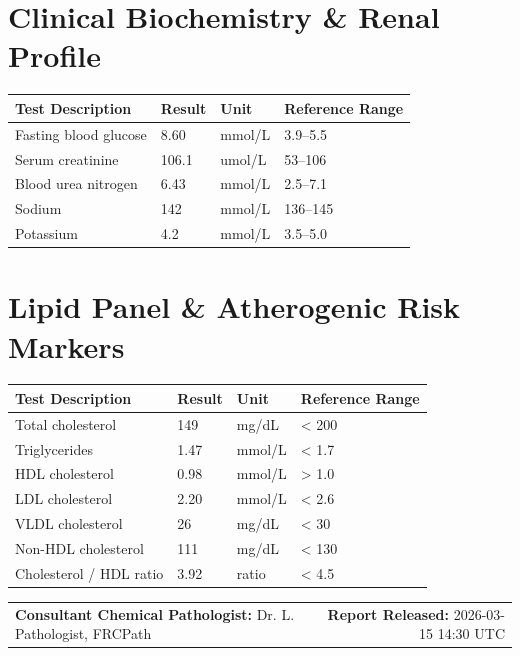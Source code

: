 \documentclass[10pt,a4paper]{article}
\begin{document}
\vspace{8pt}

\section*{Clinical Biochemistry \& Renal Profile}

\begin{tabular}{@{} p{6.4cm} p{2.5cm} p{2.5cm} p{3.1cm} @{}}
  \toprule
  \textbf{Test Description} & \textbf{Result} & \textbf{Unit} & \textbf{Reference Range} \\
  \midrule
  Fasting blood glucose & 8.60 & mmol/L & 3.9--5.5 \\
  Serum creatinine & 106.1 & umol/L & 53--106 \\
  Blood urea nitrogen & 6.43 & mmol/L & 2.5--7.1 \\
  Sodium & 142 & mmol/L & 136--145 \\
  Potassium & 4.2 & mmol/L & 3.5--5.0 \\
  \bottomrule
\end{tabular}

\vspace{8pt}

\section*{Lipid Panel \& Atherogenic Risk Markers}

\begin{tabular}{@{} p{6.4cm} p{2.5cm} p{2.5cm} p{3.1cm} @{}}
  \toprule
  \textbf{Test Description} & \textbf{Result} & \textbf{Unit} & \textbf{Reference Range} \\
  \midrule
  Total cholesterol & 149 & mg/dL & < 200 \\
  Triglycerides & 1.47 & mmol/L & < 1.7 \\
  HDL cholesterol & 0.98 & mmol/L & > 1.0 \\
  LDL cholesterol & 2.20 & mmol/L & < 2.6 \\
  VLDL cholesterol & 26 & mg/dL & < 30 \\
  Non-HDL cholesterol & 111 & mg/dL & < 130 \\
  Cholesterol / HDL ratio & 3.92 & ratio & < 4.5 \\
  \bottomrule
\end{tabular}

\vspace{14pt}

\noindent
\begin{tabular*}{\textwidth}{@{} l @{\extracolsep{\fill}} r @{}}
  \textbf{Consultant Chemical Pathologist:} Dr. L. Pathologist, FRCPath & \textbf{Report Released:} 2026-03-15 14:30 UTC \\
\end{tabular*}
\end{document}
